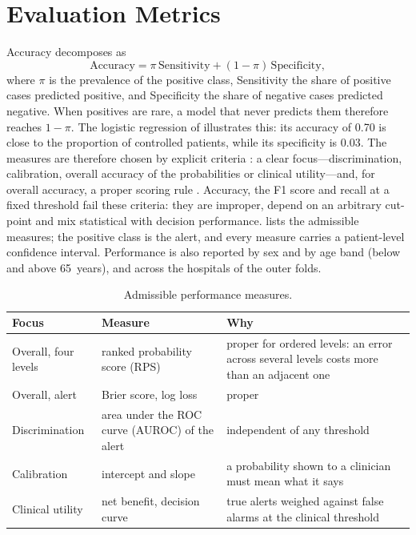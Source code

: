 \documentclass[11pt,a4paper,oneside]{report}
\begin{document}
\section{Evaluation Metrics}\label{sec:metrics}

Accuracy decomposes as
\begin{equation}
  \text{Accuracy} = \pi\,\text{Sensitivity} + (1-\pi)\,\text{Specificity},
\end{equation}
where $\pi$ is the prevalence of the positive class, Sensitivity the share of positive cases predicted positive, and Specificity the share of negative cases predicted negative. When positives are rare, a model that never predicts them therefore reaches $1-\pi$. The logistic regression of \textcite{mendoza2025} illustrates this: its accuracy of 0.70 is close to the proportion of controlled patients, while its specificity is 0.03. The measures are therefore chosen by explicit criteria \parencite{vancalster2025}: a clear focus---discrimination, calibration, overall accuracy of the probabilities or clinical utility---and, for overall accuracy, a proper scoring rule \parencite{gneiting2007}. Accuracy, the F1 score and recall at a fixed threshold fail these criteria: they are improper, depend on an arbitrary cut-point and mix statistical with decision performance.  lists the admissible measures; the positive class is the alert, and every measure carries a patient-level confidence interval. Performance is also reported by sex and by age band (below and above 65~years), and across the hospitals of the outer folds.

\begin{table}[htbp]
\centering\footnotesize
\caption{Admissible performance measures.}\label{tab:metrics}
\begin{tabularx}{\textwidth}{@{}>{\raggedright\arraybackslash}p{2.6cm} >{\raggedright\arraybackslash}p{4.2cm} X@{}}
\toprule
\textbf{Focus} & \textbf{Measure} & \textbf{Why} \\
\midrule
Overall, four levels & ranked probability score (RPS) \parencite{epstein1969} & proper for ordered levels: an error across several levels costs more than an adjacent one \\
Overall, alert & Brier score, log loss & proper \\
Discrimination & area under the ROC curve (AUROC) of the alert & independent of any threshold \\
Calibration & intercept and slope \parencite{vancalster2019} & a probability shown to a clinician must mean what it says \\
Clinical utility & net benefit, decision curve \parencite{vickers2006} & true alerts weighed against false alarms at the clinical threshold \\
\bottomrule
\end{tabularx}
\end{table}
\end{document}
